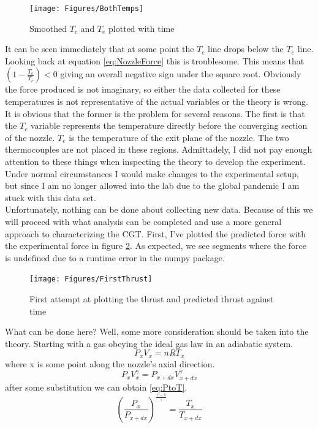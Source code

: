 \begin{figure}[h!]
\centering
\texttt{[image: Figures/BothTemps]}
\caption{Smoothed $T_c$ and $T_e$ plotted with time}
\label{fig:BothTemps}
\end{figure}
It can be seen immediately that at some point the $T_c$ line drops below the $T_e$ line. Looking back at equation \ref{eq:NozzleForce} this is troublesome. This means that $\left(1-\frac{T_e}{T_c}\right)<0$ giving an overall negative sign under the square root. Obviously the force produced is not imaginary, so either the data collected for these temperatures is not representative of the actual variables or the theory is wrong. It is obvious that the former is the problem for several reasons. The first is that the $T_c$ variable represents the temperature directly before the converging section of the nozzle. $T_e$ is the temperature of the exit plane of the nozzle. The two thermocouples are not placed in these regions. Admittadely, I did not pay enough attention to these things when inspecting the theory to develop the experiment. Under normal circumstances I would make changes to the experimental setup, but since I am no longer allowed into the lab due to the global pandemic I am stuck with this data set. \\
Unfortunately, nothing can be done about collecting new data. Because of this we will proceed with what analysis can be completed and use a more general approach to characterizing the CGT. First, I've plotted the predicted force with the experimental force in figure \ref{fig:FirstThrust}. As expected, we see segments where the force is undefined due to a runtime error in the numpy package.
\begin{figure}[h!]
\centering
\texttt{[image: Figures/FirstThrust]}
\caption{First attempt at plotting the thrust and predicted thrust against time}
\label{fig:FirstThrust}
\end{figure}
What can be done here? Well, some more consideration should be taken into the theory. Starting with a gas obeying the ideal gas law in an adiabatic system.
\begin{equation}\label{eq:IGL}
P_xV_x=nRT_x
\end{equation}
where x is some point along the nozzle's axial direction.
\begin{equation}\label{eq:Adiabat}
P_xV_x^{\gamma}=P_{x+dx}V_{x+dx}^{\gamma}
\end{equation}
after some substitution we can obtain \ref{eq:PtoT}.
\begin{equation}\label{eq:PtoT}
\left(\frac{P_x}{P_{x+dx}}\right)^{\frac{\gamma-1}{\gamma}}=\frac{T_x}{T_{x+dx}}
\end{equation}
